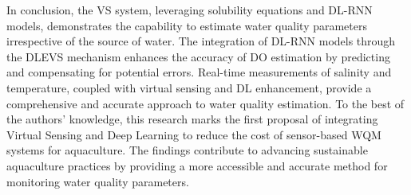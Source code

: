 \documentclass[a4paper, 11pt]{article}
\begin{document}
	In conclusion, the VS system, leveraging solubility equations and DL-RNN models, demonstrates the capability to estimate water quality parameters irrespective of the source of water. The integration of DL-RNN models through the DLEVS mechanism enhances the accuracy of DO estimation by predicting and compensating for potential errors. Real-time measurements of salinity and temperature, coupled with virtual sensing and DL enhancement, provide a comprehensive and accurate approach to water quality estimation.	
	To the best of the authors’ knowledge, this research marks the first proposal of integrating Virtual Sensing and Deep Learning to reduce the cost of sensor-based WQM systems for aquaculture. The findings contribute to advancing sustainable aquaculture practices by providing a more accessible and accurate method for monitoring water quality parameters.
	
\end{document}
